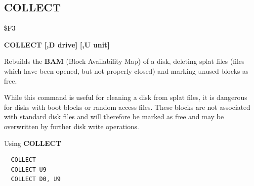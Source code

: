 \subsection{COLLECT}
\begin{description}[leftmargin=2cm,style=nextline]
\item [Token:] \$F3
\item [Format:] {\bf COLLECT [,D drive] [,U unit] }
\item [Usage:]
   Rebuilds the {\bf BAM}
   (Block Availability Map) of a disk, deleting splat files (files which have been opened,
   but not properly closed) and marking unused blocks as free.

   \drivedefinition

   \unitdefinition

\item [Remarks:]
   While this command is useful for cleaning a disk from
   splat files, it is dangerous for disks with boot blocks or random access files.
   These blocks are not associated with standard disk files
   and will therefore be marked as free and may be overwritten
   by further disk write operations.


\item [Examples:] Using {\bf COLLECT}
\begin{tcolorbox}[colback=black,coltext=white]
\verbatimfont{\codefont}
\begin{verbatim}
  COLLECT
  COLLECT U9
  COLLECT D0, U9
\end{verbatim}
\end{tcolorbox}
\end{description}


\newpage
